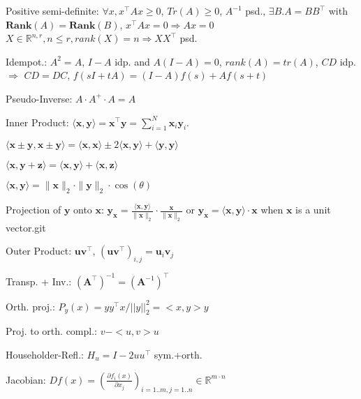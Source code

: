 \begin{compactdesc}
	\item[Positive semi-definite:] $\forall x, x^\top A x \geq 0$, $Tr(A)\geq 0$, $A^{-1}$ psd., $\exists B . A=BB^\top$ with $\mathbf{Rank}(A)=\mathbf{Rank}(B)$, $x^\top A x = 0 \Rightarrow A x = 0$ $X\in \mathbb{R}^{n,r}, n\leq r, rank(X)=n \Rightarrow XX^\top$ psd.
	\item[Idempot.:] $A^2 = A$, $I-A$ idp. and $A(I-A)=0$, $rank(A)=tr(A)$, $CD$ idp. $\Rightarrow$ $CD=DC$, $f(sI+tA)=(I-A)f(s)+A f(s+t)$
	\item[Pseudo-Inverse:] $A\cdot A^+\cdot A = A$
	\item[Inner Product:] $\langle \mathbf{x}, \mathbf{y} \rangle = \mathbf{x}^\top \mathbf{y} = \sum_{i=1}^{N} \mathbf{x}_i \mathbf{y}_i$.
	\begin{inparaitem}
		\item $\langle \mathbf{x} \pm \mathbf{y}, \mathbf{x} \pm \mathbf{y} \rangle = \langle \mathbf{x}, \mathbf{x} \rangle \pm 2 \langle \mathbf{x}, \mathbf{y} \rangle + \langle \mathbf{y}, \mathbf{y} \rangle$
		\item $\langle \mathbf{x}, \mathbf{y} + \mathbf{z} \rangle = \langle \mathbf{x}, \mathbf{y} \rangle + \langle \mathbf{x}, \mathbf{z} \rangle$
		\item $\langle \mathbf{x}, \mathbf{y} \rangle = \|\mathbf{x}\|_2 \cdot \|\mathbf{y}\|_2 \cdot \cos(\theta)$
		\item Projection of $\mathbf{y}$ onto $\mathbf{x}$: $\mathbf{y_x}= \frac{\langle \mathbf{x}, \mathbf{y} \rangle}{\|\mathbf{x}\|_2} \cdot \frac{\mathbf{x}}{\|\mathbf{x}\|_2}$ or $\mathbf{y_x}= \langle \mathbf{x}, \mathbf{y} \rangle \cdot \mathbf{x}$ when $\mathbf{x}$ is a unit vector.git 
	\end{inparaitem}
	\item[Outer Product:] $\mathbf{u} \mathbf{v}^\top$, $(\mathbf{u} \mathbf{v}^\top)_{i, j} = \mathbf{u}_i \mathbf{v}_j$
	\item[Transp. + Inv.:] $(\mathbf{A}^\top)^{-1} = (\mathbf{A}^{-1})^\top$
	\item[Orth. proj.:] $P_y(x)=y y^\top x / ||y||^2_2 = <x,y>y$
	\item[Proj. to orth. compl.:] $v-<u,v>u$
	\item[Householder-Refl.:] $H_u=I-2uu^\top$ sym.+orth.
	\item[Jacobian:] $D f(x)=(\frac{\partial f_i(x)}{\partial x_j})_{i=1..m, j=1..n} \in \mathbb{R}^{m\cdot n}$
\end{compactdesc}

